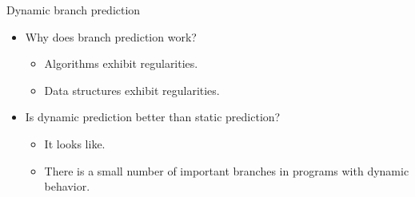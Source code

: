 \begin{frame}[t]{Dynamic branch prediction}
\begin{itemize}
  \item Why does branch prediction work?
    \begin{itemize}
      \item Algorithms exhibit regularities.
      \item Data structures exhibit regularities.
    \end{itemize}

  \item Is dynamic prediction better than static prediction?
    \begin{itemize}
      \item It looks like.
      \item There is a small number of important branches in programs with dynamic behavior.
    \end{itemize}
\end{itemize}
\end{frame}

